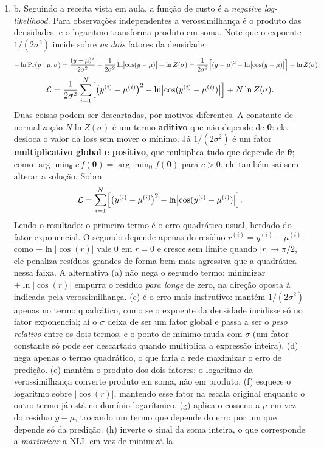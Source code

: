\documentclass{dlproblemset}
\begin{document}
\begin{enumerate}[1)]
    \item b. Seguindo a receita vista em aula, a função de custo é a \textit{negative log-likelihood}. Para observações independentes a verossimilhança é o produto das densidades, e o logaritmo transforma produto em soma. Note que o expoente $1/(2\sigma^2)$ incide sobre \emph{os dois} fatores da densidade:
    \[
    -\ln \Pr(y \mid \mu, \sigma)
     = \frac{(y - \mu)^2}{2\sigma^2} - \frac{1}{2\sigma^2}\ln\bigl|\cos(y - \mu)\bigr| + \ln Z(\sigma)
     = \frac{1}{2\sigma^2}\Bigl[ (y - \mu)^2 - \ln\bigl|\cos(y - \mu)\bigr| \Bigr] + \ln Z(\sigma),
    \]
    \[
    \mathcal{L} = \frac{1}{2\sigma^2}\sum_{i=1}^{N} \Bigl[ \bigl(y^{(i)} - \mu^{(i)}\bigr)^2 - \ln\bigl|\cos(y^{(i)} - \mu^{(i)})\bigr| \Bigr] + N\ln Z(\sigma).
    \]
    Duas coisas podem ser descartadas, por motivos diferentes. A constante de normalização $N \ln Z(\sigma)$ é um termo \textbf{aditivo} que não depende de $\boldsymbol{\theta}$: ela desloca o valor da loss sem mover o mínimo. Já $1/(2\sigma^2)$ é um fator \textbf{multiplicativo global e positivo}, que multiplica tudo que depende de $\boldsymbol{\theta}$; como $\arg\min_{\boldsymbol{\theta}} c\,f(\boldsymbol{\theta}) = \arg\min_{\boldsymbol{\theta}} f(\boldsymbol{\theta})$ para $c > 0$, ele também sai sem alterar a solução. Sobra
    \[
    \mathcal{L} = \sum_{i=1}^{N} \Bigl[ \bigl(y^{(i)} - \mu^{(i)}\bigr)^2 - \ln\bigl|\cos(y^{(i)} - \mu^{(i)})\bigr| \Bigr].
    \]
    Lendo o resultado: o primeiro termo é o erro quadrático usual, herdado do fator exponencial. O segundo depende apenas do resíduo $r^{(i)} = y^{(i)} - \mu^{(i)}$: como $-\ln|\cos(r)|$ vale $0$ em $r = 0$ e cresce sem limite quando $|r| \to \pi/2$, ele penaliza resíduos grandes de forma bem mais agressiva que a quadrática nessa faixa. A alternativa (a) não nega o segundo termo: minimizar $+\ln|\cos(r)|$ empurra o resíduo \emph{para longe} de zero, na direção oposta à indicada pela verossimilhança. (c) é o erro mais instrutivo: mantém $1/(2\sigma^2)$ apenas no termo quadrático, como se o expoente da densidade incidisse só no fator exponencial; aí o $\sigma$ deixa de ser um fator global e passa a ser o \emph{peso relativo} entre os dois termos, e o ponto de mínimo muda com $\sigma$ (um fator constante só pode ser descartado quando multiplica a expressão inteira). (d) nega apenas o termo quadrático, o que faria a rede maximizar o erro de predição. (e) mantém o produto dos dois fatores; o logaritmo da verossimilhança converte produto em soma, não em produto. (f) esquece o logaritmo sobre $|\cos(r)|$, mantendo esse fator na escala original enquanto o outro termo já está no domínio logarítmico. (g) aplica o cosseno a $\mu$ em vez do resíduo $y - \mu$, trocando um termo que depende do erro por um que depende só da predição. (h) inverte o sinal da soma inteira, o que corresponde a \emph{maximizar} a NLL em vez de minimizá-la.


\end{enumerate}
\end{document}
